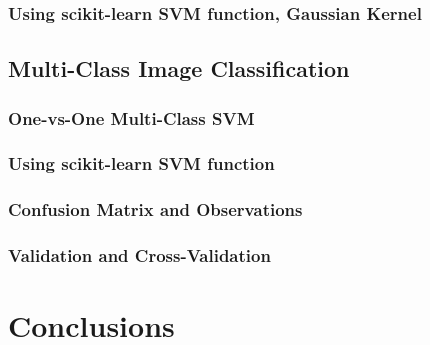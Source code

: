 \documentclass[12pt,a4paper]{article}
\begin{document}
\subsubsection{Using scikit-learn SVM function, Gaussian Kernel}

\subsection{Multi-Class Image Classification}
\subsubsection{One-vs-One Multi-Class SVM}

\subsubsection{Using scikit-learn SVM function}

\subsubsection{Confusion Matrix and Observations}

\subsubsection{Validation and Cross-Validation}

\section*{Conclusions}
\end{document}
